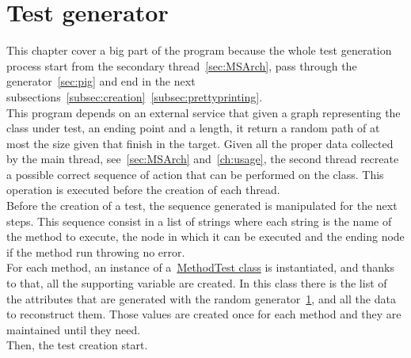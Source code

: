 \section{Test generator}\label{sec:tg}
This chapter cover a big part of the program because the whole test generation process start from the secondary thread~\ref{sec:MSArch}, pass through the generator~\ref{sec:pig} and end in the next subsections~\ref{subsec:creation}~\ref{subsec:prettyprinting}.\\
This program depends on an external service that given a graph representing the class under test, an ending point and a length, it return a random path of at most the size given that finish in the target.
Given all the proper data collected by the main thread, see~\ref{sec:MSArch} and~\ref{ch:usage}, the second thread recreate a possible correct sequence of action that can be performed on the class.
This operation is executed before the creation of each thread.\\
Before the creation of a test, the sequence generated is manipulated for the next steps.
This sequence consist in a list of strings where each string is the name of the method to execute, the node in which it can be executed and the ending node if the method run throwing no error.\\
For each method, an instance of a~\href{\projRootLink/support/test/MethodTest.java}{MethodTest class} is instantiated, and thanks to that, all the supporting variable are created.
In this class there is the list of the attributes that are generated with the random generator~\ref{sec:tg}, and all the data to reconstruct them.
Those values are created once for each method and they are maintained until they need.\\
Then, the test creation start.
